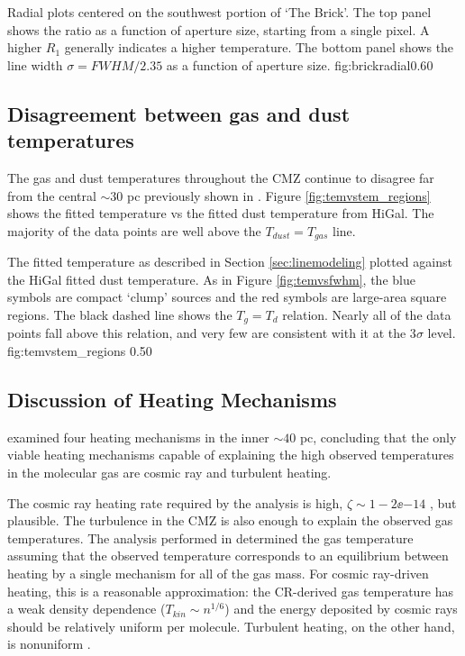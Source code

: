 {Radial plots centered on the southwest portion of `The Brick'.
The top panel shows the ratio \Rone as a function of aperture size, starting
from a single pixel.  A higher $R_1$ generally indicates a higher temperature.
The bottom panel shows the line width $\sigma = FWHM/2.35$
as a function of aperture size.}
{fig:brickradial}{0.6}{0}


\subsection{Disagreement between gas and dust temperatures}
The gas and dust temperatures throughout the CMZ continue to disagree far from
the central $\sim30$ pc previously shown in \citet{Ao2013a}.
Figure \ref{fig:temvstem_regions} shows the fitted \para temperature vs the fitted
dust temperature from HiGal.  The majority of the \formaldehyde data points are well
above the $T_{dust}=T_{gas}$ line.

{The fitted temperature as described in Section \ref{sec:linemodeling} plotted
against the HiGal fitted dust temperature.  As in Figure \ref{fig:temvsfwhm},
the blue symbols are compact `clump' sources and the red symbols are large-area
square regions.  The black dashed line shows the $T_g = T_d$ relation.  Nearly
all of the data points fall above this relation, and very few are consistent
with it at the 3$\sigma$ level.}
{fig:temvstem_regions}
{0.5}{0}

\subsection{Discussion of Heating Mechanisms}
\citet{Ao2013a} examined four heating mechanisms in the inner $\sim 40$ pc,
concluding that the only viable heating mechanisms capable of explaining the
high observed temperatures in the molecular gas are cosmic ray and turbulent
heating.  

The cosmic ray heating rate required by the \citet{Ao2013a} analysis is high,
$\zeta\sim1-2\ee{-14}$ \pers, but plausible.  The turbulence in the CMZ is also
enough to explain the observed gas temperatures. 
The analysis performed in \citet{Ao2013a} determined the gas temperature
assuming that the observed temperature corresponds to an equilibrium between
heating by a single mechanism for all of the gas mass.  For cosmic ray-driven
heating, this is a reasonable approximation: the CR-derived gas temperature
has a weak density dependence ($T_{kin}\sim n^{1/6}$) and the energy deposited
by cosmic rays should be relatively uniform per molecule.  Turbulent heating,
on the other hand, is nonuniform \citep{Pan2009a}.

